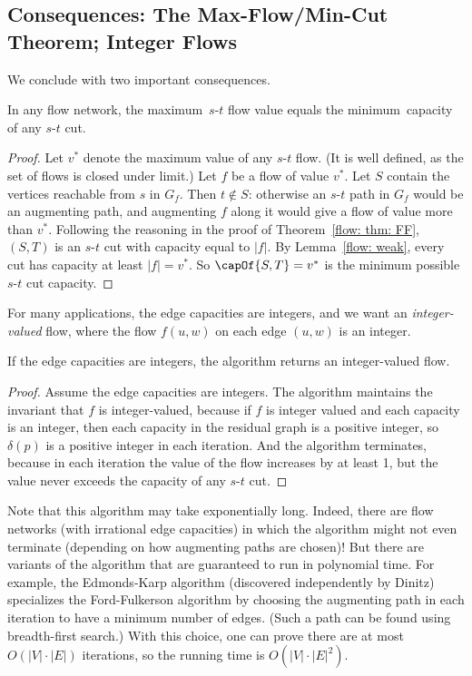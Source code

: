 \subsection{Consequences: The Max-Flow/Min-Cut Theorem; Integer Flows}\label{flow: sec: max-flow min-cut consequences}
We conclude with two important consequences.
\begin{theorem}\label{flow: theorem: max-flow min-cut}
  In any flow network, the maximum~$s$-$t$ flow
  value equals the minimum~capacity of any $s$-$t$ cut.
\end{theorem}
\begin{proof}
  Let $v^*$ denote the maximum value of any $s$-$t$ flow.
  (It is well defined, as the set of flows is closed under limit.)
  Let $f$ be a flow of value $v^*$.
  Let $S$ contain the vertices reachable from $s$ in $G_f$.
  Then $t\notin S$: otherwise an $s$-$t$ path in $G_f$ would be an augmenting path,
  and augmenting $f$ along it would give a flow of value more than $v^*$.
  Following the reasoning in the proof of Theorem~\ref{flow: thm: FF},
  $(S,T)$ is an $s$-$t$ cut with capacity equal to $|f|$.
  By Lemma~\ref{flow: weak}, every cut has capacity at least $|f| = v^*$.
  So  $\capOf {S,T} = v^*$ is the minimum possible $s$-$t$ cut capacity.
\end{proof}


For many applications, the edge capacities are integers,
and we want an \emph{integer-valued} flow,
where the flow $f(u,w)$ on each edge $(u,w)$ is an integer.
\begin{theorem}
  If the edge capacities are integers, the algorithm 
   returns an integer-valued flow.
\end{theorem}
\begin{proof}
  Assume the edge capacities are integers.
  The algorithm maintains the invariant that $f$ is integer-valued,
  because if $f$ is integer valued and each capacity is an integer,
  then each capacity in the residual graph is a positive integer,
  so $\delta(p)$ is a positive integer in each iteration.
  And the algorithm terminates,
  because in each iteration the value of the flow increases by at least 1,
  but the value never exceeds the capacity of any $s$-$t$ cut.
\end{proof}

Note that this algorithm may take exponentially long.
Indeed, there are flow networks (with irrational edge capacities)
in which the algorithm might not even terminate
(depending on how augmenting paths are chosen)!
But there are variants of the algorithm
that are guaranteed to run in polynomial time.
For example, the Edmonds-Karp algorithm (discovered independently by Dinitz)
specializes the Ford-Fulkerson algorithm by choosing the augmenting path in each iteration
to have a minimum number of edges.  (Such a path can be found using breadth-first search.)
With this choice, one can prove there are at most $O(|V|\cdot|E|)$ iterations,
so the running time is $O(|V|\cdot|E|^2)$.

